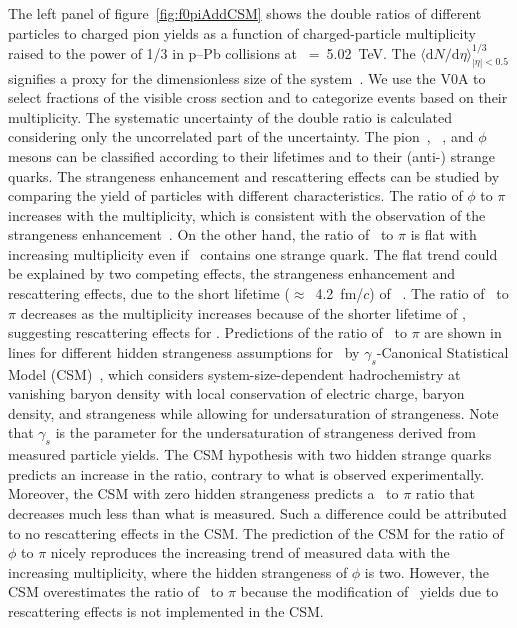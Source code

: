 The left panel of figure~\ref{fig:f0piAddCSM} shows the double ratios of different particles to charged pion yields as a function of charged-particle multiplicity raised to the power of 1/3 in p--Pb collisions at \snn~=~5.02~TeV. The $\langle \mathrm{d}N/\mathrm{d}\eta \rangle_{|\eta|<0.5}^{1/3}$ signifies a proxy for the dimensionless size of the system~\cite{Liu:2018xae}. We use the V0A to select fractions of the visible cross section and to categorize events based on their multiplicity. The systematic uncertainty of the double ratio is calculated considering only the uncorrelated part of the uncertainty. The pion~\cite{ALICE:2016dei}, \kstar~\cite{ALICE:2016sak}, and $\phi$~\cite{ALICE:2016sak} mesons can be classified according to their lifetimes and to their (anti-) strange quarks. The strangeness enhancement and rescattering effects can be studied by comparing the yield of particles with different characteristics. The ratio of $\phi$ to $\pi$ increases with the multiplicity, which is consistent with the observation of the strangeness enhancement~\cite{ALICE:2016fzo}. On the other hand, the ratio of \kstar~to $\pi$ is flat with increasing multiplicity even if \kstar~contains one strange quark. The flat trend could be explained by two competing effects, the strangeness enhancement and rescattering effects, due to the short lifetime ($\approx$~4.2~fm/$c$) of \kstar~\cite{ParticleDataGroup:2022pth}. The ratio of \fzero~to $\pi$ decreases as the multiplicity increases because of the shorter lifetime of \fzero, suggesting rescattering effects for \fzero. Predictions of the ratio of \fzero~to $\pi$ are shown in lines for different hidden strangeness assumptions for \fzero~by $\gamma_{s}$-Canonical Statistical Model (CSM)~\cite{Vovchenko:2019kes}, which considers system-size-dependent hadrochemistry at vanishing baryon density with local conservation of electric charge, baryon density, and strangeness while allowing for undersaturation of strangeness. Note that $\gamma_{s}$ is the parameter for the undersaturation of strangeness derived from measured particle yields. The CSM hypothesis with two hidden strange quarks predicts an increase in the ratio, contrary to what is observed experimentally. Moreover, the CSM with zero hidden strangeness predicts a \fzero~to $\pi$ ratio that decreases much less than what is measured. Such a difference could be attributed to no rescattering effects in the CSM. The prediction of the CSM for the ratio of $\phi$ to $\pi$ nicely reproduces the increasing trend of measured data with the increasing multiplicity, where the hidden strangeness of $\phi$ is two. However, the CSM overestimates the ratio of \kstar~to $\pi$ because the modification of \kstar~yields due to rescattering effects is not implemented in the CSM.

